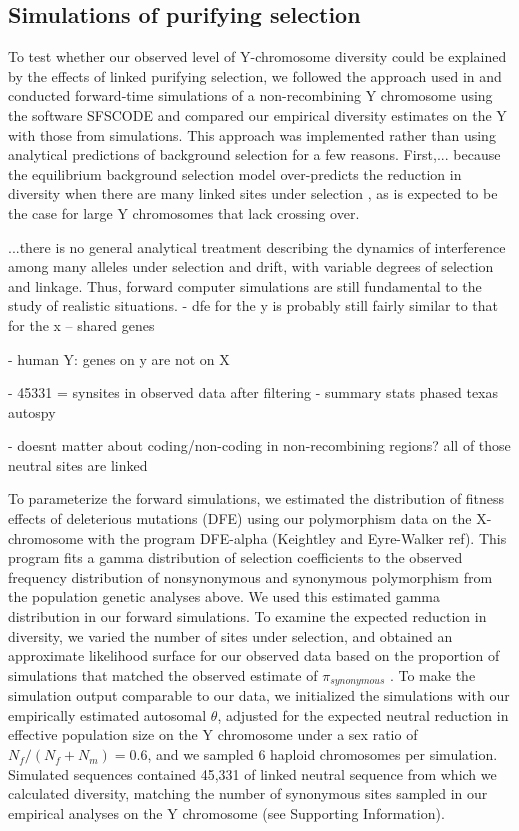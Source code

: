 \documentclass[9pt,twocolumn,twoside]{gsajnl}
\begin{document}
\subsection*{Simulations of purifying selection}
To test whether our observed level of Y-chromosome diversity could be explained by the effects of linked purifying selection, we followed the approach used in \citep{Wilsonsayres2014} and conducted forward-time simulations of a non-recombining Y chromosome using the software SFSCODE \citep{hernandez2008flexible} and compared our empirical diversity estimates on the Y with those from simulations. This approach was implemented rather than using analytical predictions of background selection for a few reasons. First,... because the equilibrium background selection model over-predicts the reduction in diversity when there are many linked sites under selection \citep{KaiserCharlesworth}, as is expected to be the case for large Y chromosomes that lack crossing over.


...there is no general analytical treatment describing the dynamics of interference among many alleles under selection and drift, with variable degrees of selection and linkage. Thus, forward computer simulations are still fundamental to the study of realistic situations.
- dfe for the y is probably still fairly similar to that for the x -- shared genes

- human Y: genes on y are not on X

- 45331 = synsites in observed data after filtering
  - summary stats phased texas autospy

- doesnt matter about coding/non-coding in non-recombining regions? all of those neutral sites are linked



To parameterize the forward simulations, we estimated the distribution of fitness effects of deleterious mutations (DFE) using our polymorphism data on the X-chromosome with the program DFE-alpha (\X Keightley and Eyre-Walker ref). This program fits a gamma distribution of selection coefficients to the observed frequency distribution of nonsynonymous and synonymous polymorphism from the population genetic analyses above. We used this estimated gamma distribution in our forward simulations. To examine the expected reduction in diversity, we varied the number of sites under selection, and obtained an approximate likelihood surface for our observed data based on the proportion of simulations that matched the observed estimate of $\pi_{synonymous}$ . To make the simulation output comparable to our data, we initialized the simulations with our empirically estimated autosomal $\theta$, adjusted for the expected neutral reduction in effective population size on the Y chromosome under a sex ratio of $N_{f}/(N_{f}+N_{m})=0.6$, and we sampled 6 haploid chromosomes per simulation. Simulated sequences contained 45,331 of linked neutral sequence from which we calculated diversity, matching the number of synonymous sites sampled in our empirical analyses on the Y chromosome (see Supporting Information).
\end{document}
